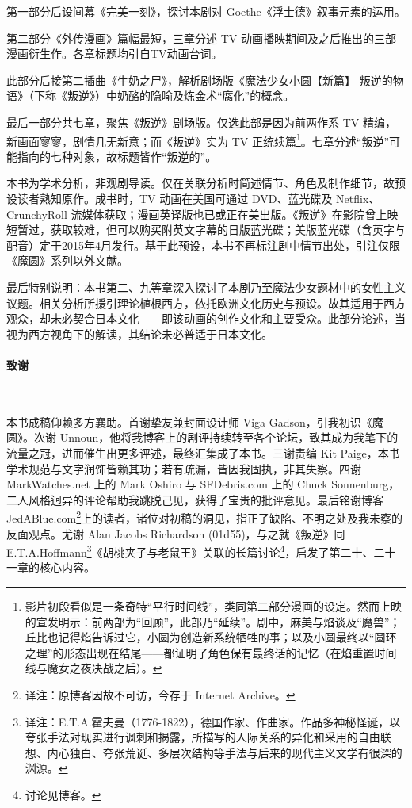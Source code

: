 第一部分后设间幕《完美一刻》，探讨本剧对 Goethe《浮士德》叙事元素的运用。

第二部分《外传漫画》篇幅最短，三章分述 TV 动画播映期间及之后推出的三部漫画衍生作。各章标题均引自TV动画台词。

此部分后接第二插曲《牛奶之尸》，解析剧场版《魔法少女小圆【新篇】 叛逆的物语》（下称《叛逆》）中奶酪的隐喻及炼金术“腐化”的概念。

最后一部分共七章，聚焦《叛逆》剧场版。仅选此部是因为前两作系 TV 精编，新画面寥寥，剧情几无新意；而《叛逆》实为 TV 正统续篇\footnote{影片初段看似是一条奇特“平行时间线”，类同第二部分漫画的设定。然而上映的宣发明示：前两部为“回顾”，此部乃“延续”。剧中，麻美与焰谈及“魔兽”；丘比也记得焰告诉过它，小圆为创造新系统牺牲的事；以及小圆最终以“圆环之理”的形态出现在结尾——都证明了角色保有最终话的记忆（在焰重置时间线与魔女之夜决战之后）。}\cite{ref8}。七章分述“叛逆”可能指向的七种对象，故标题皆作“叛逆的\underline{\makebox[1cm]{}}”。

本书为学术分析，非观剧导读。仅在关联分析时简述情节、角色及制作细节，故预设读者熟知原作。成书时，TV 动画在美国可通过 DVD、蓝光碟及 Netflix、CrunchyRoll 流媒体获取；漫画英译版也已或正在美出版。《叛逆》在影院曾上映短暂过，获取较难，但可以购买附英文字幕的日版蓝光碟；美版蓝光碟（含英字与配音）定于2015年4月发行。基于此预设，本书不再标注剧中情节出处，引注仅限《魔圆》系列以外文献。

最后特别说明：本书第二、九等章深入探讨了本剧乃至魔法少女题材中的女性主义议题。相关分析所援引理论植根西方，依托欧洲文化历史与预设。故其适用于西方观众，却未必契合日本文化——即该动画的创作文化和主要受众。此部分论述，当视为西方视角下的解读，其结论未必普适于日本文化。
\paragraph{致谢}~{}

本书成稿仰赖多方襄助。首谢挚友兼封面设计师 Viga Gadson，引我初识《魔圆》。次谢 Unnoun，他将我博客上的剧评持续转至各个论坛，致其成为我笔下的流量之冠，进而催生出更多评述，最终汇集成了本书。三谢责编 Kit Paige，本书学术规范与文字润饰皆赖其功；若有疏漏，皆因我固执，非其失察。四谢 MarkWatches.net 上的 Mark Oshiro 与 SFDebris.com 上的 Chuck Sonnenburg，二人风格迥异的评论帮助我跳脱己见，获得了宝贵的批评意见。最后铭谢博客 JedABlue.com\footnote{译注：原博客因故不可访，今存于 Internet Archive。}上的读者，诸位对初稿的洞见，指正了缺陷、不明之处及我未察的反面观点。尤谢 Alan Jacobs Richardson (01d55)，与之就《叛逆》同 E.T.A.Hoffmann\footnote{译注：E.T.A.霍夫曼（1776-1822），德国作家、作曲家。作品多神秘怪诞，以夸张手法对现实进行讽刺和揭露，所描写的人际关系的异化和采用的自由联想、内心独白、夸张荒诞、多层次结构等手法与后来的现代主义文学有很深的渊源。}《胡桃夹子与老鼠王》关联的长篇讨论\footnote{讨论见博客。}\cite{ref9}，启发了第二十、二十一章的核心内容。
